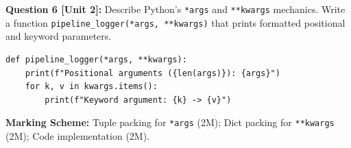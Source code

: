 \noindent\textbf{Question 6 [Unit 2]:} Describe Python's \texttt{*args} and \texttt{**kwargs} mechanics. Write a function \texttt{pipeline\_logger(*args, **kwargs)} that prints formatted positional and keyword parameters.
\begin{solutionbox}
\begin{lstlisting}
def pipeline_logger(*args, **kwargs):
    print(f"Positional arguments ({len(args)}): {args}")
    for k, v in kwargs.items():
        print(f"Keyword argument: {k} -> {v}")
\end{lstlisting}
\end{solutionbox}
\begin{markingrubric}
\textbf{Marking Scheme:} Tuple packing for \texttt{*args} (2M); Dict packing for \texttt{**kwargs} (2M); Code implementation (2M).
\end{markingrubric}
